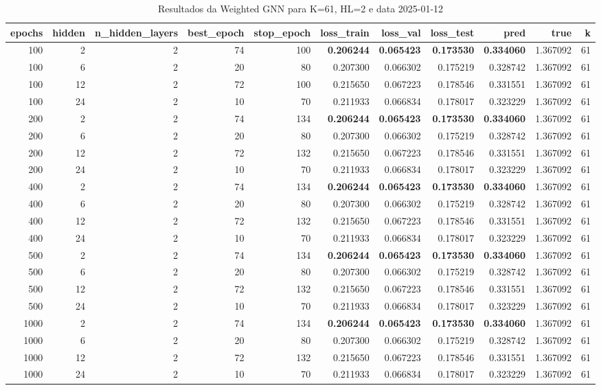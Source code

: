 \begin{table}
\caption{Resultados da Weighted GNN para K=61, HL=2 e data 2025-01-12}
\label{tab:weighted_gnn_results_k61_hl2_d20250112}
\begin{tabular}{rrrrrrrrrrr}
\toprule
epochs & hidden & n\_hidden\_layers & best\_epoch & stop\_epoch & loss\_train & loss\_val & loss\_test & pred & true & k \\
\midrule
100 & 2 & 2 & 74 & 100 & \textbf{0.206244} & \textbf{0.065423} & \textbf{0.173530} & \textbf{0.334060} & 1.367092 & 61 \\
100 & 6 & 2 & 20 & 80 & 0.207300 & 0.066302 & 0.175219 & 0.328742 & 1.367092 & 61 \\
100 & 12 & 2 & 72 & 100 & 0.215650 & 0.067223 & 0.178546 & 0.331551 & 1.367092 & 61 \\
100 & 24 & 2 & 10 & 70 & 0.211933 & 0.066834 & 0.178017 & 0.323229 & 1.367092 & 61 \\
200 & 2 & 2 & 74 & 134 & \textbf{0.206244} & \textbf{0.065423} & \textbf{0.173530} & \textbf{0.334060} & 1.367092 & 61 \\
200 & 6 & 2 & 20 & 80 & 0.207300 & 0.066302 & 0.175219 & 0.328742 & 1.367092 & 61 \\
200 & 12 & 2 & 72 & 132 & 0.215650 & 0.067223 & 0.178546 & 0.331551 & 1.367092 & 61 \\
200 & 24 & 2 & 10 & 70 & 0.211933 & 0.066834 & 0.178017 & 0.323229 & 1.367092 & 61 \\
400 & 2 & 2 & 74 & 134 & \textbf{0.206244} & \textbf{0.065423} & \textbf{0.173530} & \textbf{0.334060} & 1.367092 & 61 \\
400 & 6 & 2 & 20 & 80 & 0.207300 & 0.066302 & 0.175219 & 0.328742 & 1.367092 & 61 \\
400 & 12 & 2 & 72 & 132 & 0.215650 & 0.067223 & 0.178546 & 0.331551 & 1.367092 & 61 \\
400 & 24 & 2 & 10 & 70 & 0.211933 & 0.066834 & 0.178017 & 0.323229 & 1.367092 & 61 \\
500 & 2 & 2 & 74 & 134 & \textbf{0.206244} & \textbf{0.065423} & \textbf{0.173530} & \textbf{0.334060} & 1.367092 & 61 \\
500 & 6 & 2 & 20 & 80 & 0.207300 & 0.066302 & 0.175219 & 0.328742 & 1.367092 & 61 \\
500 & 12 & 2 & 72 & 132 & 0.215650 & 0.067223 & 0.178546 & 0.331551 & 1.367092 & 61 \\
500 & 24 & 2 & 10 & 70 & 0.211933 & 0.066834 & 0.178017 & 0.323229 & 1.367092 & 61 \\
1000 & 2 & 2 & 74 & 134 & \textbf{0.206244} & \textbf{0.065423} & \textbf{0.173530} & \textbf{0.334060} & 1.367092 & 61 \\
1000 & 6 & 2 & 20 & 80 & 0.207300 & 0.066302 & 0.175219 & 0.328742 & 1.367092 & 61 \\
1000 & 12 & 2 & 72 & 132 & 0.215650 & 0.067223 & 0.178546 & 0.331551 & 1.367092 & 61 \\
1000 & 24 & 2 & 10 & 70 & 0.211933 & 0.066834 & 0.178017 & 0.323229 & 1.367092 & 61 \\
\bottomrule
\end{tabular}
\end{table}

